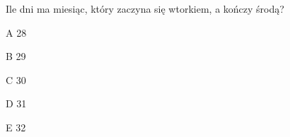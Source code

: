 \begin{tresc}
Ile dni ma miesiąc, który zaczyna się wtorkiem, a kończy środą?
\end{tresc}
\begin{wariant}{A} 28 \end{wariant}
\begin{wariant}{B} 29 \end{wariant}
\begin{wariant}{C} 30 \end{wariant}
\begin{wariant}{D} 31 \end{wariant}
\begin{wariant}{E} 32 \end{wariant}
